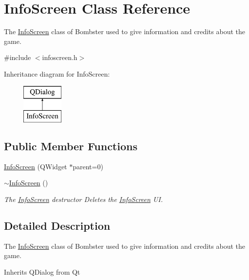 \hypertarget{class_info_screen}{\section{Info\-Screen Class Reference}
\label{class_info_screen}
}


The \hyperlink{class_info_screen}{Info\-Screen} class of Bombster used to give information and credits about the game.  




{\ttfamily \#include $<$infoscreen.\-h$>$}

Inheritance diagram for Info\-Screen\-:\begin{figure}[H]
\begin{center}
\leavevmode
\includegraphics[height=2.000000cm]{class_info_screen}
\end{center}
\end{figure}
\subsection*{Public Member Functions}
\begin{DoxyCompactItemize}
\item 
\hyperlink{class_info_screen_a334bc1b328e13d04889b2f166806de9e}{Info\-Screen} (Q\-Widget $\ast$parent=0)
\item 
\hyperlink{class_info_screen_adc57e13bff37154e1db3346d1ef5c77a}{$\sim$\-Info\-Screen} ()
\begin{DoxyCompactList}\small\item\em The \hyperlink{class_info_screen}{Info\-Screen} destructor Deletes the \hyperlink{class_info_screen}{Info\-Screen} U\-I. \end{DoxyCompactList}\end{DoxyCompactItemize}


\subsection{Detailed Description}
The \hyperlink{class_info_screen}{Info\-Screen} class of Bombster used to give information and credits about the game. 

Inherits Q\-Dialog from Qt 

